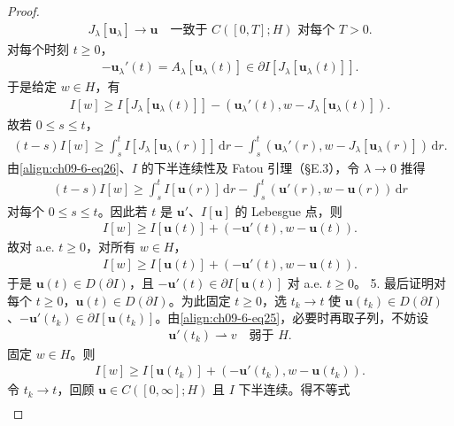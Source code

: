 \documentclass[../../main.tex]{subfiles}
\begin{document}
\begin{theorem}[梯度流的解]
\begin{proof}
\begin{align}
J_\lambda[\mathbf{u}_\lambda]\to\mathbf{u}\quad\text{一致于 }C([0,T];H)\text{ 对每个 }T>0.\label{align:ch09-6-eq26}
\end{align}
对每个时刻 $t\geqslant 0$，
\begin{align*}
-\mathbf{u}_\lambda'(t)=A_\lambda[\mathbf{u}_\lambda(t)]\in\partial I[J_\lambda[\mathbf{u}_\lambda(t)]].
\end{align*}
于是给定 $w\in H$，有
\begin{align*}
I[w]\geqslant I[J_\lambda[\mathbf{u}_\lambda(t)]]-(\mathbf{u}_\lambda'(t),w-J_\lambda[\mathbf{u}_\lambda(t)]).
\end{align*}
故若 $0\leqslant s\leqslant t$，
\begin{align*}
(t-s)I[w]\geqslant\int_s^t I[J_\lambda[\mathbf{u}_\lambda(r)]]\,\mathrm{d}r-\int_s^t(\mathbf{u}_\lambda'(r),w-J_\lambda[\mathbf{u}_\lambda(r)])\,\mathrm{d}r.
\end{align*}
由\eqref{align:ch09-6-eq26}、$I$ 的下半连续性及 Fatou 引理（\S E.3），令 $\lambda\to 0$ 推得
\begin{align*}
(t-s)I[w]\geqslant\int_s^t I[\mathbf{u}(r)]\,\mathrm{d}r-\int_s^t(\mathbf{u}'(r),w-\mathbf{u}(r))\,\mathrm{d}r
\end{align*}
对每个 $0\leqslant s\leqslant t$。因此若 $t$ 是 $\mathbf{u}'$、$I[\mathbf{u}]$ 的 Lebesgue 点，则
\begin{align*}
I[w]\geqslant I[\mathbf{u}(t)]+(-\mathbf{u}'(t),w-\mathbf{u}(t)).
\end{align*}
故对 a.e. $t\geqslant 0$，对所有 $w\in H$，
\begin{align*}
I[w]\geqslant I[\mathbf{u}(t)]+(-\mathbf{u}'(t),w-\mathbf{u}(t)).
\end{align*}
于是 $\mathbf{u}(t)\in D(\partial I)$，且 $-\mathbf{u}'(t)\in\partial I[\mathbf{u}(t)]$ 对 a.e. $t\geqslant 0$。
5. 最后证明对每个 $t\geqslant 0$，$\mathbf{u}(t)\in D(\partial I)$。为此固定 $t\geqslant 0$，选 $t_k\to t$ 使 $\mathbf{u}(t_k)\in D(\partial I)$、$-\mathbf{u}'(t_k)\in\partial I[\mathbf{u}(t_k)]$。由\eqref{align:ch09-6-eq25}，必要时再取子列，不妨设
\begin{align*}
\mathbf{u}'(t_k)\rightharpoonup v\quad\text{弱于 }H.
\end{align*}
固定 $w\in H$。则
\begin{align*}
I[w]\geqslant I[\mathbf{u}(t_k)]+(-\mathbf{u}'(t_k),w-\mathbf{u}(t_k)).
\end{align*}
令 $t_k\to t$，回顾 $\mathbf{u}\in C([0,\infty];H)$ 且 $I$ 下半连续。得不等式
\begin{align*}

\end{align*}
\end{proof}
\end{theorem}
\end{document}
